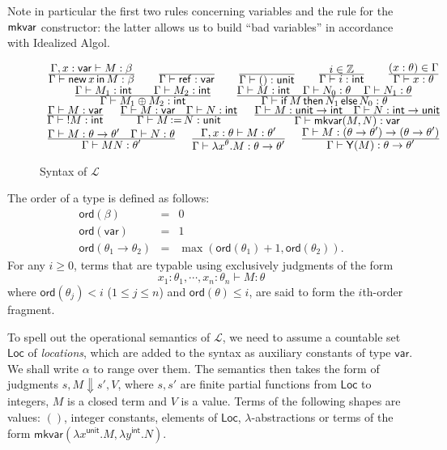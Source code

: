 \documentclass{CSML}
\theoremstyle{definition}\newtheorem{definition}[thm]{Definition}
\theoremstyle{definition}\newtheorem{example}[thm]{Example}
\theoremstyle{definition}\newtheorem{proposition}[thm]{Proposition}
\theoremstyle{definition}\newtheorem{lemma}[thm]{Lemma}
\theoremstyle{definition}\newtheorem{theorem}[thm]{Theorem}
\theoremstyle{definition}\newtheorem{corollary}[thm]{Corollary}
\theoremstyle{definition}\newtheorem{remark}[thm]{Remark}
\newcommand\nt[1]{#1}
\newcommand\ds{\displaystyle}
\newcommand\badvar[2]{\mathsf{mkvar}(#1,#2)}
\newcommand\fix[1]{\mathsf{Y}(#1)}
\newcommand{\aasg}{\,\raisebox{0.065ex}{:}{=}\,}
\newcommand\comt{\mathsf{unit}}
\newcommand\expt{\mathsf{int}}
\newcommand\vart{\mathsf{var}}
\renewcommand\red[2]{#1 \Downarrow #2}
\newcommand\cond[3]{\mathsf{if}\,#1\,\mathsf{then}\,#2\,\mathsf{else}\,#3}
\newcommand{\rarr}{\rightarrow}
\newcommand\intnum{\mathbb Z}
\newcommand\seq[2]{{#1} \vdash {#2}}
\newcommand\lang{\mathcal{L}}
\newcommand\new[2]{\mathsf{new}\,#1\,\mathsf{in}\,#2}
\newcommand\newc{\mathsf{ref}}
\newcommand\loc{\mathsf{Loc}}
\newcommand\ord[1]{\mathsf{ord}(#1)}
\begin{document}
Note in particular the first two rules concerning variables and the rule for the $\sf mkvar$ constructor: the latter allows us to build ``bad variables'' in accordance with Idealized Algol. 
\begin{figure}[t]
\renewcommand\arraystretch{2.5}
\[\begin{array}{c}
\frac{\ds\seq{\Gamma,x:\vart}{M:\beta}}{\ds \seq{\Gamma}{\new{x}{M}:\beta}}\qquad\frac{}{\ds \seq{\Gamma}{\newc:\vart}} \qquad
\frac{}{\ds \seq{\Gamma}{\mathsf{()}:\comt}} \qquad
\frac{\ds i\in \intnum}{\ds \seq{\Gamma}{i:\expt}}\qquad
\frac{\ds (x:\theta)\in \Gamma}{\ds \seq{\Gamma}{x:\theta}}
\\
\frac{\ds\seq{\Gamma}{M_1:\expt}\qquad \seq{\Gamma}{M_2:\expt}}{\ds\seq{\Gamma}{M_1\oplus M_2:\expt}}\qquad\,
\frac{\ds \seq{\Gamma}{M:\expt}\quad\,
          \seq{\Gamma}{N_0:\theta}\quad\,  \seq{\Gamma}{N_1:\theta}}
{\ds\seq{\Gamma}{\cond{M}{N_1}{N_0}:\theta}}\\
\frac{\ds\seq{\Gamma}{M:\vart}}{\ds\seq{\Gamma}{!M:\expt}}\quad\,\,
\frac{\ds \seq{\Gamma}{M:\vart}\quad\seq{\Gamma}{N:\expt}}{\ds \seq{\Gamma}{M\aasg N:\comt}}\quad\,\,
\frac{\ds\seq{\Gamma}{M:\comt\rarr\expt}\quad\seq{\Gamma}{N:\expt\rarr\comt}}{\ds
\seq{\Gamma}{\badvar{M}{N}:\vart}}\\
\frac{\ds\seq{\Gamma}{M:\theta\rarr\theta'}\quad\seq{\Gamma}{N:\theta}}{\ds 
\seq{\Gamma}{MN:\theta'}}\quad\,\,
\frac{\ds\seq{\Gamma,x:\theta}{M:\theta'}}{\ds \seq{\Gamma}{\lambda x^\theta.M:\theta\rarr\theta'}}\quad\,\,
\frac{\ds\seq{\Gamma}{M:(\theta\rarr\theta')\rarr(\theta\rarr\theta')}}{\ds\seq{\Gamma}{\fix{M}:\theta\rarr\theta'}}\\
\end{array}\]
\caption{Syntax of $\lang$\label{fig:syntax}}
\makebox[\textwidth][l]{\hrulefill}
\end{figure}
{The order of a type is defined as follows: 
\[\begin{array}{rcl}
\ord{\beta}&=&0\\
\ord{\vart}&=&1\\
\ord{\theta_1\rarr\theta_2}&=& \max (\ord{\theta_1}+1,\ord{\theta_2}).
\end{array}\]}
For any $i\ge 0$, 
terms that are typable using exclusively judgments of the
form 
\[ \seq{x_1:\theta_1,\cdots,x_n:\theta_n}{M:\theta}\] 
where $\ord{\theta_j}<i$ ($1\le j\le n$) and $\ord{\theta}\le i$,
are said to form the $i$th-order fragment.

To spell out the operational semantics of $\lang$, we need to assume a countable set $\loc$
of \emph{locations}, which are added to the syntax as auxiliary constants of type $\vart$.
We shall write $\alpha$ to range over them.
The semantics then takes the form of judgments $\red{s,M}{s',V}$, where $s,s'$ are
finite partial functions from $\loc$ to integers, $M$ is a \nt{closed} term and $V$ is a value.
Terms of the following shapes are values:  $()$, integer constants, elements of $\loc$, 
$\lambda$-abstractions or terms of the form $\badvar{\lambda x^\comt.M}{\lambda y^\expt.N}$.
\end{document}
